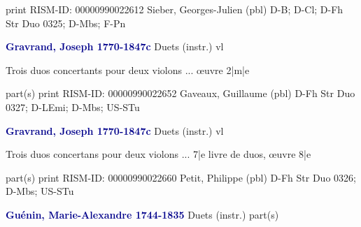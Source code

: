 \documentclass[twocolumn]{book}
\begin{document}
\newline print
\newline RISM-ID: 00000990022612
\newline Sieber, Georges-Julien  (pbl)
\newline D-B; D-Cl; D-Fh  Str Duo 0325; D-Mbs; F-Pn
\newline \par \vspace{7pt} \textcolor{darkblue}{\textbf{Gravrand, Joseph  1770-1847c}}
\newline Duets (instr.)    
 vl
\newline \begin{itshape}Trois duos concertants pour deux violons ... œuvre 2|m|e\end{itshape} 
\newline \textcolor{darkblue}{}  part(s)  
\newline print
\newline RISM-ID: 00000990022652
\newline Gaveaux, Guillaume  (pbl)
\newline D-Fh  Str Duo 0327; D-LEmi; D-Mbs; US-STu
\newline \par \vspace{7pt} \textcolor{darkblue}{\textbf{Gravrand, Joseph  1770-1847c}}
\newline Duets (instr.)    
 vl
\newline \begin{itshape}Trois duos concertans pour deux violons ... 7|e livre de duos, œuvre 8|e\end{itshape} 
\newline \textcolor{darkblue}{}  part(s)  
\newline print
\newline RISM-ID: 00000990022660
\newline Petit, Philippe  (pbl)
\newline D-Fh  Str Duo 0326; D-Mbs; US-STu
\newline \par \vspace{7pt} \textcolor{darkblue}{\textbf{Guénin, Marie-Alexandre  1744-1835}}
\newline Duets (instr.)    
\newline \textcolor{darkblue}{}  part(s)  
\end{document}
